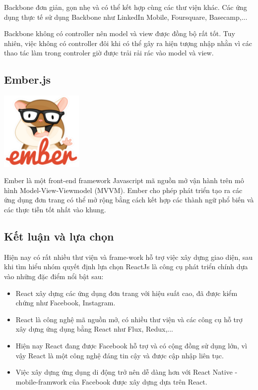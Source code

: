 Backbone đơn giản, gọn nhẹ và có thể kết hợp cùng các thư viện khác. Các ứng dụng thực tế sử dụng Backbone như LinkedIn Mobile, Foursquare, Basecamp,...

Backbone không có controller nên model và view được đồng bộ rất tốt. Tuy nhiên, việc không có controller đôi khi có thể gây ra hiện tượng nhập nhằn vì các thao tác làm trong controler giờ được trải rải rác vào model và view.
\subsection{Ember.js}
\begin{center}
  \captionsetup{type=figure}
  \includegraphics[width=4cm]{img/ember-logo.png}
\end{center}

Ember là một front-end framework Javascript mã nguồn mở vận hành trên mô hình Model-View-Viewmodel (MVVM). Ember cho phép phát triển tạo ra các ứng dụng đơn trang có thể mở rộng bằng cách kết hợp các thành ngữ phổ biến và các thực tiễn tốt nhất vào khung.
\subsection{Kết luận và lựa chọn}
Hiện nay có rất nhiều thư viện và frame-work hỗ trợ việc xây dựng giao diện, sau khi tìm hiểu nhóm quyết định lựa chọn ReactJs là công cụ phát triển chính dựa vào những đặc điểm nổi bật sau:
\begin{itemize}
    \item React xây dựng các ứng dụng đơn trang với hiệu suất cao, đã được kiểm chứng như Facebook, Instagram.
    \item React là công nghệ mã nguồn mở, có nhiều thư viện và các công cụ hỗ trợ xây dựng ứng dụng bằng React như Flux, Redux,...
    \item Hiện nay React đang được Facebook hỗ trợ và có cộng đồng sử dụng lớn, vì vậy React là một công nghệ đáng tin cậy và được cập nhập liên tục.
    \item Việc xây dựng ứng dụng di động trở nên dễ dàng hơn với React Native - mobile-framwork của Facebook được xây dựng dựa trên React.
\end {itemize}    